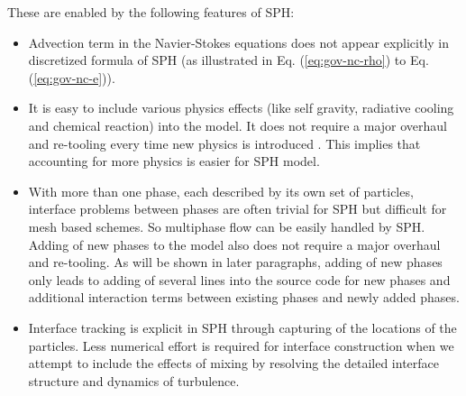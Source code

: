 \documentclass[gmd, manuscript]{copernicus}
\begin{document}
These are enabled by the following features of SPH:
\begin{itemize}
\item Advection term in the Navier-Stokes equations does not appear explicitly in discretized formula of SPH (as illustrated in Eq. (\ref{eq:gov-nc-rho}) to Eq. (\ref{eq:gov-nc-e})).
\item It is easy to include various physics effects (like self gravity, radiative cooling and chemical reaction) into the model. It does not require a major overhaul and re-tooling every time new physics is introduced \citep{monaghan1995sph}. This implies that accounting for more physics is easier for SPH model.
\item With more than one phase, each described by its own set of particles, interface problems between phases are often trivial for SPH but difficult for mesh based schemes. So multiphase flow can be easily handled by SPH. Adding of new phases to the model also does not require a major overhaul and re-tooling. As will be shown in later paragraphs, adding of new phases only leads to adding of several lines into the source code for new phases and additional interaction terms between existing phases and newly added phases.
\item Interface tracking is explicit in SPH through capturing of the locations of the particles. Less numerical effort is required for interface construction when we attempt to include the effects of mixing by resolving the detailed interface structure and dynamics of turbulence.
\end{itemize}
\end{document}
